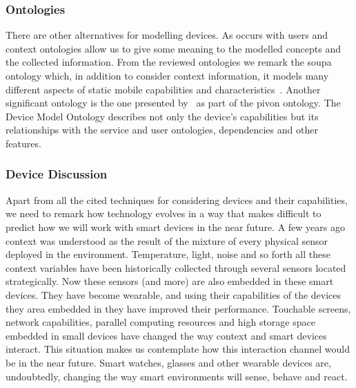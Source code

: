 \subsubsection{Ontologies}

There are other alternatives for modelling devices. As occurs with users and 
context ontologies allow us to give some meaning to the modelled concepts and 
the collected information. From the reviewed ontologies we remark the \ac{soupa} 
ontology which, in addition to consider context information, it models many 
different aspects of static mobile capabilities and characteristics~\citep{chen_soupa_2004}. 
Another significant ontology is the one presented by~\citet{hervas_context_2010} 
as part of the \ac{pivon} ontology. The Device Model Ontology describes not only 
the device's capabilities but its relationships with the service and user ontologies, 
dependencies and other features.

\subsubsection{Device Discussion}
\label{sec:device_discussion}

Apart from all the cited techniques for considering devices and their capabilities,
we need to remark how technology evolves in a way that makes difficult to predict
how we will work with smart devices in the near future. A few years ago context 
was understood as the result of the mixture of every physical sensor deployed in 
the environment. Temperature, light, noise and so forth all these context variables have 
been historically collected through several sensors located strategically. Now 
these sensors (and more) are also embedded in these smart devices. They have 
become wearable, and using their capabilities of the devices they area embedded 
in they have improved their performance. Touchable screens, network capabilities,
parallel computing resources and high storage space embedded in small devices 
have changed the way context and smart devices interact. This situation makes 
us contemplate how this interaction channel would be in the near future. Smart 
watches, glasses and other wearable devices are, undoubtedly, changing the way 
smart environments will sense, behave and react.

